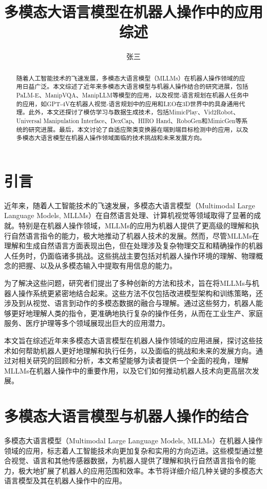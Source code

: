 \documentclass[a4paper]{article}
\title{多模态大语言模型在机器人操作中的应用综述}
\author{张三}
\begin{document}
\maketitle


 \begin{abstract} 
 随着人工智能技术的飞速发展，多模态大语言模型（MLLMs）在机器人操作领域的应用日益广泛。本文综述了近年来多模态大语言模型与机器人操作结合的研究进展，包括PaLM-E、ManipVQA、ManipLLM等模型的应用，以及视觉-语言规划在机器人任务中的应用，如GPT-4V在机器人视觉-语言规划中的应用和LEO在3D世界中的具身通用代理。此外，本文还探讨了模仿学习与数据生成技术，包括MimicPlay、Vid2Robot、Universal Manipulation Interface、DexCap、HIRO Hand、RoboGen和MimicGen等系统的研究进展。最后，本文讨论了自适应聚类变换器在端到端目标检测中的应用，以及多模态大语言模型在机器人操作领域面临的技术挑战和未来发展方向。 
 \end{abstract}
\section{引言}
近年来，随着人工智能技术的飞速发展，多模态大语言模型（Multimodal Large Language Models, MLLMs）在自然语言处理、计算机视觉等领域取得了显著的成就。特别是在机器人操作领域，MLLMs的应用为机器人提供了更高级的理解和执行自然语言指令的能力，极大地推动了机器人技术的发展。然而，尽管MLLMs在理解和生成自然语言方面表现出色，但在处理涉及复杂物理交互和精确操作的机器人任务时，仍面临诸多挑战。这些挑战主要包括对机器人操作环境的理解、物理概念的把握、以及从多模态输入中提取有用信息的能力。

为了解决这些问题，研究者们提出了多种创新的方法和技术，旨在将MLLMs与机器人操作系统更紧密地结合起来。这些方法不仅包括改进模型架构和训练策略，还涉及到从视觉、语言到动作的多模态数据的融合与理解。通过这些努力，机器人能够更好地理解人类的指令，更准确地执行复杂的操作任务，从而在工业生产、家庭服务、医疗护理等多个领域展现出巨大的应用潜力。

本文旨在综述近年来多模态大语言模型在机器人操作领域的应用进展，探讨这些技术如何帮助机器人更好地理解和执行任务，以及面临的挑战和未来的发展方向。通过对相关研究的回顾和分析，本文希望能够为读者提供一个全面的视角，理解MLLMs在机器人操作中的重要作用，以及它们如何推动机器人技术向更高层次发展。
\section{多模态大语言模型与机器人操作的结合}
多模态大语言模型（Multimodal Large Language Models, MLLMs）在机器人操作领域的应用，标志着人工智能技术向更加复杂和实用的方向迈进。这些模型通过整合视觉、语言和其他传感器数据，为机器人提供了理解和执行自然语言指令的能力，极大地扩展了机器人的应用范围和效率。本节将详细介绍几种关键的多模态大语言模型及其在机器人操作中的应用。
\end{document}
